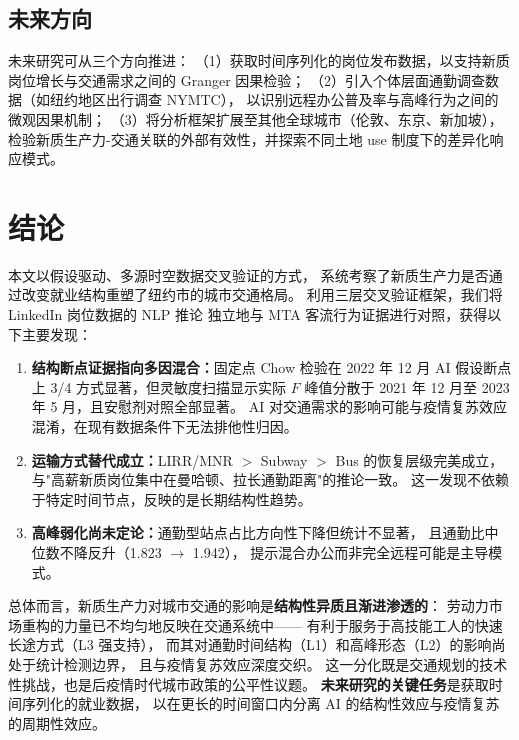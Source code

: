 \documentclass[runningheads]{llncs}
\begin{document}
\subsection{未来方向}

未来研究可从三个方向推进：
（1）获取时间序列化的岗位发布数据，以支持新质岗位增长与交通需求之间的 Granger 因果检验；
（2）引入个体层面通勤调查数据（如纽约地区出行调查 NYMTC），
以识别远程办公普及率与高峰行为之间的微观因果机制；
（3）将分析框架扩展至其他全球城市（伦敦、东京、新加坡），
检验新质生产力-交通关联的外部有效性，并探索不同土地 use 制度下的差异化响应模式。

\section{结论}

本文以假设驱动、多源时空数据交叉验证的方式，
系统考察了新质生产力是否通过改变就业结构重塑了纽约市的城市交通格局。
利用三层交叉验证框架，我们将 LinkedIn 岗位数据的 NLP 推论
独立地与 MTA 客流行为证据进行对照，获得以下主要发现：

\begin{enumerate}
  \item \textbf{结构断点证据指向多因混合：}固定点 Chow 检验在 2022 年 12 月
        AI 假设断点上 3/4 方式显著，但灵敏度扫描显示实际 $F$ 峰值分散于
        2021 年 12 月至 2023 年 5 月，且安慰剂对照全部显著。
        AI 对交通需求的影响可能与疫情复苏效应混淆，在现有数据条件下无法排他性归因。
  \item \textbf{运输方式替代成立：}LIRR/MNR $>$ Subway $>$ Bus 的恢复层级完美成立，
        与"高薪新质岗位集中在曼哈顿、拉长通勤距离"的推论一致。
        这一发现不依赖于特定时间节点，反映的是长期结构性趋势。
  \item \textbf{高峰弱化尚未定论：}通勤型站点占比方向性下降但统计不显著，
        且通勤比中位数不降反升（1.823 $\to$ 1.942），
        提示混合办公而非完全远程可能是主导模式。
\end{enumerate}

总体而言，新质生产力对城市交通的影响是\textbf{结构性异质且渐进渗透的}：
劳动力市场重构的力量已不均匀地反映在交通系统中——
有利于服务于高技能工人的快速长途方式（L3 强支持），
而其对通勤时间结构（L1）和高峰形态（L2）的影响尚处于统计检测边界，
且与疫情复苏效应深度交织。
这一分化既是交通规划的技术性挑战，也是后疫情时代城市政策的公平性议题。
\textbf{未来研究的关键任务}是获取时间序列化的就业数据，
以在更长的时间窗口内分离 AI 的结构性效应与疫情复苏的周期性效应。
\end{document}
